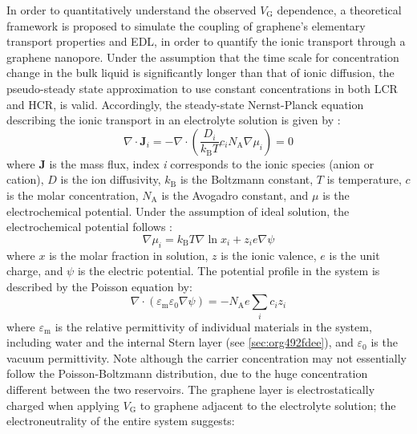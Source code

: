 In order to quantitatively understand the observed $V_{\mathrm{G}}$
dependence, a theoretical framework is proposed to simulate the
coupling of graphene's elementary transport properties and EDL, in
order to quantify the ionic transport through a graphene
nanopore. Under the assumption that the time scale for concentration
change in the bulk liquid is significantly longer than
that of ionic diffusion, the pseudo-steady state approximation to use constant concentrations in both LCR and HCR, is valid.
%
Accordingly, the steady-state Nernst-Planck equation describing
the ionic transport in an electrolyte solution is given by
\autocite{MacGillivray_1968_NPE}:
\begin{equation}
  \label{eq:np-pnp}
  \nabla \cdot \symbf{J}_{i} = -\nabla \cdot (\frac{D_{i}}{k_{\mathrm{B}}T} c_{i} N_{\mathrm{A}} \nabla \mu_{i}) = 0
\end{equation}
where $\symbf{J}$ is the mass flux, index \textit{i} corresponds to
the ionic species (anion or cation), $D$ is the ion
diffusivity, $k_{\mathrm{B}}$ is the Boltzmann constant, $T$ is
temperature, $c$ is the molar concentration, $N_{\mathrm{A}}$ is the
Avogadro constant, and $\mu$ is the electrochemical potential. Under
the assumption of ideal solution, the electrochemical potential
follows \autocite{Kilic_2007_steric_effect_ion}:
\begin{equation}
  \label{eq:np-mu}
  \nabla \mu_{i} = k_{\mathrm{B}} T \nabla \ln x_{i} + z_{i} e \nabla \psi
\end{equation}
where $x$ is the molar fraction in solution, $z$ is the ionic valence,
$e$ is the unit charge, and $\psi$ is the electric potential.
%
The potential profile in the system is described by the Poisson
equation by:
\begin{equation}
  \label{eq:np-poisson}
  \nabla \cdot (\varepsilon_{\mathrm{m}} \varepsilon_{0} \nabla \psi)
  =
  - N_{\mathrm{A}} e \sum_{i} c_{i} z_{i}
\end{equation}
where $\varepsilon_{\mathrm{m}}$ is the relative permittivity of
individual materials in the system, including water and the internal
Stern layer (see \autoref{sec:org492fdee}), and $\varepsilon_{0}$ is
the vacuum permittivity.
%
Note although the carrier concentration may not essentially follow the
Poisson-Boltzmann distribution, due to the huge concentration
different between the two reservoirs\autocite{Zheng_2011_PNPB}.
%
The graphene layer is electrostatically charged when
applying $V_{\mathrm{G}}$ to graphene adjacent to the electrolyte
solution; the electroneutrality of the entire system suggests:
